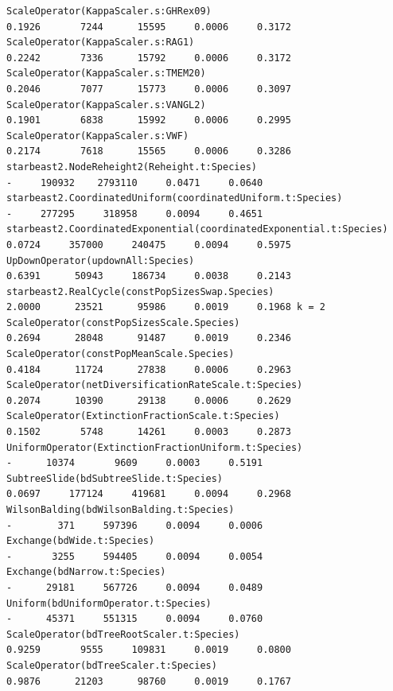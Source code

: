 \documentclass[12pt]{article}
\begin{document}
\begin{verbatim}
ScaleOperator(KappaScaler.s:GHRex09)                                    0.1926       7244      15595     0.0006     0.3172 
ScaleOperator(KappaScaler.s:RAG1)                                       0.2242       7336      15792     0.0006     0.3172 
ScaleOperator(KappaScaler.s:TMEM20)                                     0.2046       7077      15773     0.0006     0.3097 
ScaleOperator(KappaScaler.s:VANGL2)                                     0.1901       6838      15992     0.0006     0.2995 
ScaleOperator(KappaScaler.s:VWF)                                        0.2174       7618      15565     0.0006     0.3286 
starbeast2.NodeReheight2(Reheight.t:Species)                                 -     190932    2793110     0.0471     0.0640 
starbeast2.CoordinatedUniform(coordinatedUniform.t:Species)                  -     277295     318958     0.0094     0.4651 
starbeast2.CoordinatedExponential(coordinatedExponential.t:Species)     0.0724     357000     240475     0.0094     0.5975 
UpDownOperator(updownAll:Species)                                       0.6391      50943     186734     0.0038     0.2143 
starbeast2.RealCycle(constPopSizesSwap.Species)                         2.0000      23521      95986     0.0019     0.1968 k = 2
ScaleOperator(constPopSizesScale.Species)                               0.2694      28048      91487     0.0019     0.2346 
ScaleOperator(constPopMeanScale.Species)                                0.4184      11724      27838     0.0006     0.2963 
ScaleOperator(netDiversificationRateScale.t:Species)                    0.2074      10390      29138     0.0006     0.2629 
ScaleOperator(ExtinctionFractionScale.t:Species)                        0.1502       5748      14261     0.0003     0.2873 
UniformOperator(ExtinctionFractionUniform.t:Species)                         -      10374       9609     0.0003     0.5191 
SubtreeSlide(bdSubtreeSlide.t:Species)                                  0.0697     177124     419681     0.0094     0.2968 
WilsonBalding(bdWilsonBalding.t:Species)                                     -        371     597396     0.0094     0.0006 
Exchange(bdWide.t:Species)                                                   -       3255     594405     0.0094     0.0054 
Exchange(bdNarrow.t:Species)                                                 -      29181     567726     0.0094     0.0489 
Uniform(bdUniformOperator.t:Species)                                         -      45371     551315     0.0094     0.0760 
ScaleOperator(bdTreeRootScaler.t:Species)                               0.9259       9555     109831     0.0019     0.0800
ScaleOperator(bdTreeScaler.t:Species)                                   0.9876      21203      98760     0.0019     0.1767 


\end{verbatim}
\end{document}
